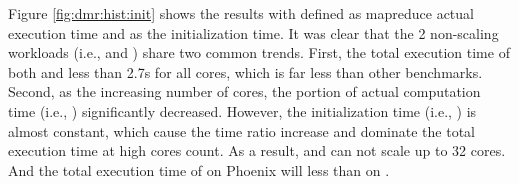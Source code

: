 

Figure \ref{fig:dmr:hist:init} shows the results with  defined as mapreduce actual execution time and  as the initialization time. 
It was clear that the 2 non-scaling workloads (i.e.,  and ) share two common trends. 
First, the total execution time of both  and  less than 2.7s for all cores, which is far less than other benchmarks. 
Second, as the increasing number of cores, the portion of actual computation time (i.e., ) significantly decreased.
However, the initialization time (i.e., ) is almost constant, which cause the  time ratio increase and dominate the total execution time at high cores count. 
As a result,   and  can not scale up to 32 cores.
And the total execution time of  on Phoenix will less than on \myds.





